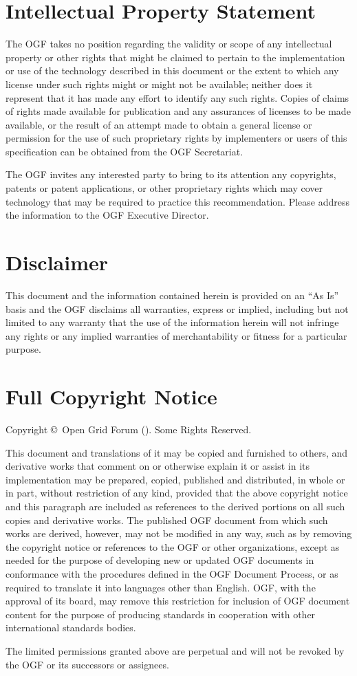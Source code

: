 
\section{Intellectual Property Statement}

The OGF takes no position regarding the validity or scope of any intellectual property or other rights that might be claimed to pertain to the implementation or use of the technology described in this document or the extent to which any license under such rights might or might not be available; neither does it represent that it has made any effort to identify any such rights.  Copies of claims of rights made available for publication and any assurances of licenses to be made available, or the result of an attempt made to obtain a general license or permission for the use of such proprietary rights by implementers or users of this specification can be obtained from the OGF Secretariat.

The OGF invites any interested party to bring to its attention any copyrights, patents or patent applications, or other proprietary rights which may cover technology that may be required to practice this recommendation.  Please address the information to the OGF Executive Director.

\section{Disclaimer}

This document and the information contained herein is provided on an ``As Is'' basis and the OGF disclaims all warranties, express or implied, including but not limited to any warranty that the use of the information herein will not infringe any rights or any implied warranties of merchantability or fitness for a particular purpose.

\section{Full Copyright Notice}

Copyright \copyright \ Open Grid Forum (\copyrightyears). Some Rights Reserved.

This document and translations of it may be copied and furnished to others, and derivative works that comment on or otherwise explain it or assist in its implementation may be prepared, copied, published and distributed, in whole or in part, without restriction of any kind, provided that the above copyright notice and this paragraph are included as references to the derived portions on all such copies and derivative works. The published OGF document from which such works are derived, however, may not be modified in any way, such as by removing the copyright notice or references to the OGF or other organizations, except as needed for the purpose of developing new or updated OGF documents in conformance with the procedures defined in the OGF Document Process, or as required to translate it into languages other than English. OGF, with the approval of its board, may remove this restriction for inclusion of OGF document content for the purpose of producing standards in cooperation with other international standards bodies. 

The limited permissions granted above are perpetual and will not be revoked by the OGF or its successors or assignees. 

